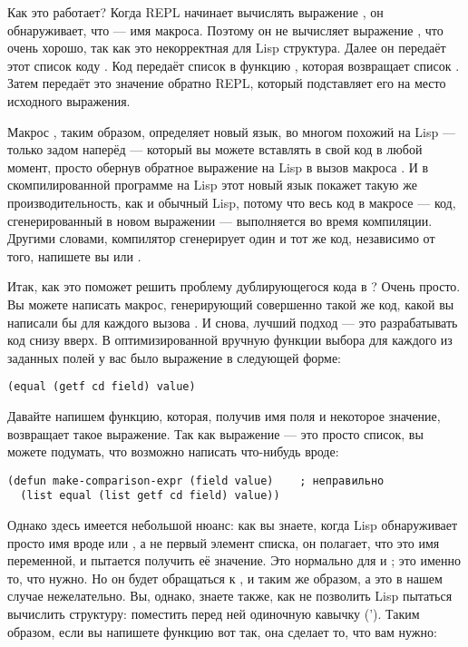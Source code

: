 Как это работает? Когда REPL начинает вычислять выражение , он
обнаруживает, что  --- имя макроса. Поэтому он не вычисляет выражение
, что очень хорошо, так как это некорректная для Lisp
структура. Далее он передаёт этот список коду . Код 
передаёт список в функцию , которая возвращает список . Затем  передаёт это значение обратно REPL, который
подставляет его на место исходного выражения.

Макрос , таким образом, определяет новый язык, во многом похожий на Lisp
--- только задом наперёд --- который вы можете вставлять в свой код в любой момент, просто
обернув обратное выражение на Lisp в вызов макроса . И в скомпилированной
программе на Lisp этот новый язык покажет такую же производительность, как и обычный Lisp,
потому что весь код в макросе --- код, сгенерированный в новом выражении --- выполняется
во время компиляции. Другими словами, компилятор сгенерирует один и тот же код, независимо
от того, напишете вы  или .

Итак, как это поможет решить проблему дублирующегося кода в ? Очень просто. Вы
можете написать макрос, генерирующий совершенно такой же код, какой вы написали бы для
каждого вызова . И снова, лучший подход --- это разрабатывать код снизу
вверх. В оптимизированной вручную функции выбора  для каждого из заданных
полей у вас было выражение в следующей форме:

\begin{lstlisting}
(equal (getf cd field) value)
\end{lstlisting}

Давайте напишем функцию, которая, получив имя поля и некоторое значение, возвращает такое
выражение. Так как выражение --- это просто список, вы можете подумать, что возможно
написать что-нибудь вроде:

\begin{lstlisting}
(defun make-comparison-expr (field value)    ; неправильно
  (list equal (list getf cd field) value))
\end{lstlisting}

Однако здесь имеется небольшой нюанс: как вы знаете, когда Lisp обнаруживает просто имя
вроде  или , а не первый элемент списка, он полагает, что это имя
переменной, и пытается получить её значение. Это нормально для  и
; это именно то, что нужно. Но он будет обращаться к , 
и  таким же образом, а это в нашем случае нежелательно. Вы, однако, знаете также,
как не позволить Lisp пытаться вычислить структуру: поместить перед ней одиночную кавычку
(\code{}'). Таким образом, если вы напишете функцию  вот так,
она сделает то, что вам нужно:

